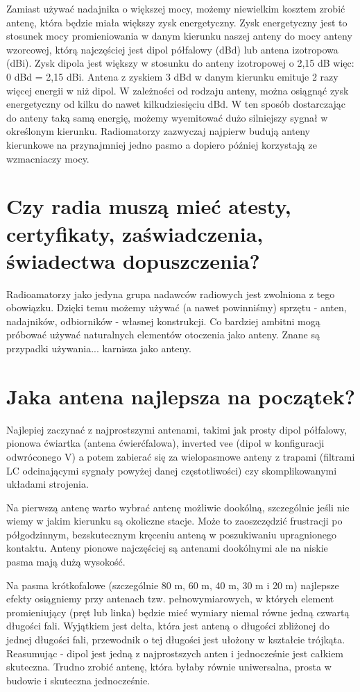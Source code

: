 \documentclass[a4paper,12pt]{article}
\begin{document}
Zamiast używać nadajnika o większej mocy, możemy niewielkim kosztem zrobić antenę, która będzie miała większy zysk energetyczny. Zysk energetyczny jest to stosunek mocy promieniowania w danym kierunku naszej anteny do mocy anteny wzorcowej, którą najczęściej jest dipol półfalowy (dBd) lub antena izotropowa (dBi). Zysk dipola jest większy w stosunku do anteny izotropowej o 2,15 dB więc: 0 dBd = 2,15 dBi. Antena z zyskiem 3 dBd w danym kierunku emituje 2 razy więcej energii w niż dipol. W zależności od rodzaju anteny, można osiągnąć zysk energetyczny od kilku do nawet kilkudziesięciu dBd. W ten sposób dostarczając do anteny taką samą energię, możemy wyemitować dużo silniejszy sygnał w określonym kierunku. Radiomatorzy zazwyczaj najpierw budują anteny kierunkowe na przynajmniej jedno pasmo a dopiero później korzystają ze wzmacniaczy mocy.

\section{Czy radia muszą mieć atesty, certyfikaty, zaświadczenia, świadectwa dopuszczenia?}
Radioamatorzy jako jedyna grupa nadawców radiowych jest zwolniona z tego obowiązku. Dzięki temu możemy używać (a nawet powinniśmy) sprzętu - anten, nadajników, odbiorników - własnej konstrukcji. Co bardziej ambitni mogą próbować używać naturalnych elementów otoczenia jako anteny. Znane są przypadki używania... karnisza jako anteny.

\section{Jaka antena najlepsza na początek?}
Najlepiej zaczynać z najprostszymi antenami, takimi jak prosty dipol półfalowy, pionowa ćwiartka (antena ćwierćfalowa), inverted vee (dipol w konfiguracji odwróconego V) a potem zabierać się za wielopasmowe anteny z trapami (filtrami LC odcinającymi sygnały powyżej danej częstotliwości) czy skomplikowanymi układami strojenia.

Na pierwszą antenę warto wybrać antenę możliwie dookólną, szczególnie jeśli nie wiemy w jakim kierunku są okoliczne stacje. Może to zaoszczędzić frustracji po półgodzinnym, bezskutecznym kręceniu anteną w poszukiwaniu upragnionego kontaktu. Anteny pionowe najczęściej są antenami dookólnymi ale na niskie pasma mają dużą wysokość.

Na pasma krótkofalowe (szczególnie 80 m, 60 m, 40 m, 30 m i 20 m) najlepsze efekty osiągniemy przy antenach tzw. pełnowymiarowych, w których element promieniujący (pręt lub linka) będzie mieć wymiary niemal równe jedną czwartą długości fali. Wyjątkiem jest delta, która jest anteną o długości zbliżonej do jednej długości fali, przewodnik o tej długości jest ułożony w kształcie trójkąta. Reasumując - dipol jest jedną z najprostszych anten i jednocześnie jest całkiem skuteczna. Trudno zrobić antenę, która byłaby równie uniwersalna, prosta w budowie i skuteczna jednocześnie.
\end{document}
